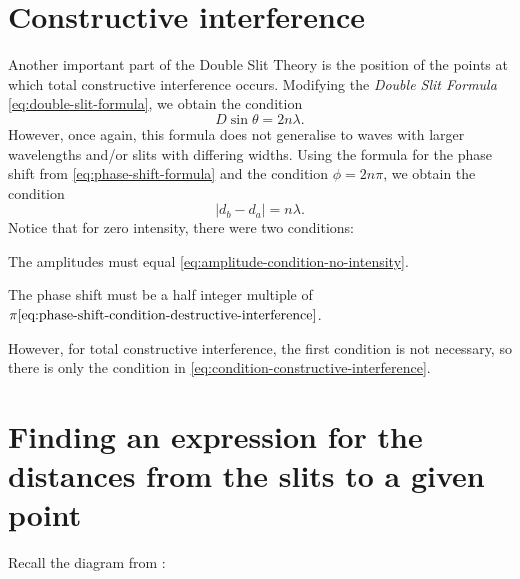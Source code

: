 \documentclass{paper}
\begin{document}
\section{Constructive interference}
Another important part of the Double Slit Theory is the position of the
points at which total constructive interference occurs. Modifying the 
\textit{Double Slit Formula} \eqref{eq:double-slit-formula}, we obtain
the condition 
\begin{equation}
    D\sin{\theta} = 2n\lambda.
\end{equation}
However, once again, this formula does not generalise to waves with larger wavelengths
and/or slits with differing widths. Using the formula for the phase shift from \eqref{eq:phase-shift-formula}
and the condition $\phi = 2n\pi$, we obtain the condition
\begin{equation}
    \label{eq:condition-constructive-interference}
    \lvert{}d_{b} - d_{a}\rvert = n\lambda.
\end{equation}
Notice that for zero intensity, there were two conditions:
\begin{boldenumerate}
    \item The amplitudes must equal \eqref{eq:amplitude-condition-no-intensity}.
    \item The phase shift must be a half integer multiple of $\pi \eqref{eq:phase-shift-condition-destructive-interference}$.
\end{boldenumerate}
However, for total constructive interference, the first condition is not necessary,
so there is only the condition in \eqref{eq:condition-constructive-interference}.
\section{Finding an expression for the distances from the slits to a given point}
Recall the diagram from :
\end{document}
